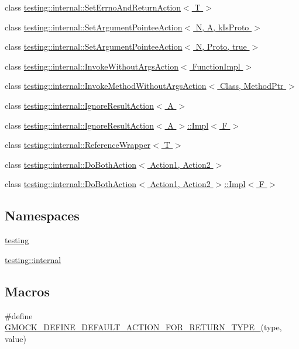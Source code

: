 \begin{DoxyCompactItemize}
\item 
class \hyperlink{classtesting_1_1internal_1_1SetErrnoAndReturnAction}{testing\+::internal\+::\+Set\+Errno\+And\+Return\+Action$<$ T $>$}
\item 
class \hyperlink{classtesting_1_1internal_1_1SetArgumentPointeeAction}{testing\+::internal\+::\+Set\+Argument\+Pointee\+Action$<$ N, A, k\+Is\+Proto $>$}
\item 
class \hyperlink{classtesting_1_1internal_1_1SetArgumentPointeeAction_3_01N_00_01Proto_00_01true_01_4}{testing\+::internal\+::\+Set\+Argument\+Pointee\+Action$<$ N, Proto, true $>$}
\item 
class \hyperlink{classtesting_1_1internal_1_1InvokeWithoutArgsAction}{testing\+::internal\+::\+Invoke\+Without\+Args\+Action$<$ Function\+Impl $>$}
\item 
class \hyperlink{classtesting_1_1internal_1_1InvokeMethodWithoutArgsAction}{testing\+::internal\+::\+Invoke\+Method\+Without\+Args\+Action$<$ Class, Method\+Ptr $>$}
\item 
class \hyperlink{classtesting_1_1internal_1_1IgnoreResultAction}{testing\+::internal\+::\+Ignore\+Result\+Action$<$ A $>$}
\item 
class \hyperlink{classtesting_1_1internal_1_1IgnoreResultAction_1_1Impl}{testing\+::internal\+::\+Ignore\+Result\+Action$<$ A $>$\+::\+Impl$<$ F $>$}
\item 
class \hyperlink{classtesting_1_1internal_1_1ReferenceWrapper}{testing\+::internal\+::\+Reference\+Wrapper$<$ T $>$}
\item 
class \hyperlink{classtesting_1_1internal_1_1DoBothAction}{testing\+::internal\+::\+Do\+Both\+Action$<$ Action1, Action2 $>$}
\item 
class \hyperlink{classtesting_1_1internal_1_1DoBothAction_1_1Impl}{testing\+::internal\+::\+Do\+Both\+Action$<$ Action1, Action2 $>$\+::\+Impl$<$ F $>$}
\end{DoxyCompactItemize}
\subsection*{Namespaces}
\begin{DoxyCompactItemize}
\item 
 \hyperlink{namespacetesting}{testing}
\item 
 \hyperlink{namespacetesting_1_1internal}{testing\+::internal}
\end{DoxyCompactItemize}
\subsection*{Macros}
\begin{DoxyCompactItemize}
\item 
\#define \hyperlink{gmock-actions_8h_a06b1e6cd1145acf7849e4a112976016b}{G\+M\+O\+C\+K\+\_\+\+D\+E\+F\+I\+N\+E\+\_\+\+D\+E\+F\+A\+U\+L\+T\+\_\+\+A\+C\+T\+I\+O\+N\+\_\+\+F\+O\+R\+\_\+\+R\+E\+T\+U\+R\+N\+\_\+\+T\+Y\+P\+E\+\_\+}(type,  value)
\end{DoxyCompactItemize}
